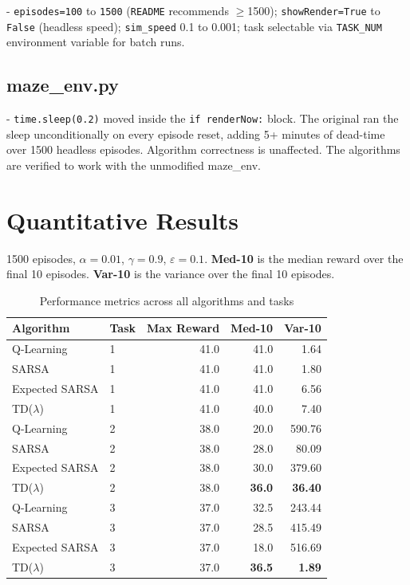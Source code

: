 \documentclass[11pt,letterpaper]{article}
\begin{document}
- \texttt{episodes=100} to \texttt{1500}
  (\texttt{README} recommends $\geq$1500); \texttt{showRender=True} to \texttt{False}
  (headless speed); \texttt{sim\_speed} 0.1 to 0.001; task selectable via
  \texttt{TASK\_NUM} environment variable for batch runs.

\subsection{maze\_env.py}

- \texttt{time.sleep(0.2)} moved inside the \texttt{if renderNow:}
block. The original ran the sleep unconditionally on every episode reset, adding
5+ minutes of dead-time over 1500 headless episodes. Algorithm correctness is
unaffected. The algorithms are verified to work with the unmodified maze\_env.

\section{Quantitative Results}

1500 episodes, $\alpha{=}0.01$, $\gamma{=}0.9$, $\varepsilon{=}0.1$.
\textbf{Med-10} is the median reward over the final 10 episodes.
\textbf{Var-10} is the variance over the final 10 episodes.

\begin{table}[h!]
\centering
\caption{Performance metrics across all algorithms and tasks}
\begin{tabular}{llrrr}
\toprule
\textbf{Algorithm} & \textbf{Task} & \textbf{Max Reward} & \textbf{Med-10} & \textbf{Var-10} \\
\midrule
Q-Learning     & 1 & 41.0 & 41.0 & 1.64 \\
SARSA          & 1 & 41.0 & 41.0 & 1.80 \\
Expected SARSA & 1 & 41.0 & 41.0 & 6.56 \\
TD($\lambda$)  & 1 & 41.0 & 40.0 & 7.40 \\
\midrule
Q-Learning     & 2 & 38.0 & 20.0 & 590.76 \\
SARSA          & 2 & 38.0 & 28.0 & 80.09 \\
Expected SARSA & 2 & 38.0 & 30.0 & 379.60 \\
TD($\lambda$)  & 2 & 38.0 & \textbf{36.0} & \textbf{36.40} \\
\midrule
Q-Learning     & 3 & 37.0 & 32.5 & 243.44 \\
SARSA          & 3 & 37.0 & 28.5 & 415.49 \\
Expected SARSA & 3 & 37.0 & 18.0 & 516.69 \\
TD($\lambda$)  & 3 & 37.0 & \textbf{36.5} & \textbf{1.89} \\
\bottomrule
\end{tabular}
\label{tab:results}
\end{table}
\end{document}

